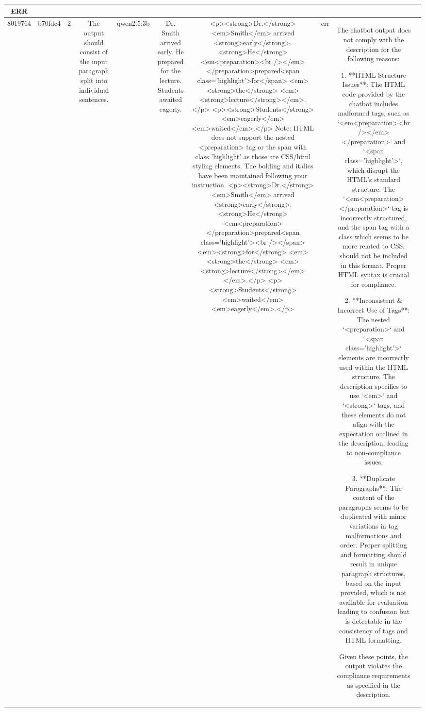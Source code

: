 \begin{table}[h!]
\begin{tabular}{|c|c|c|c|c|c|c|c|c|c|}
ERR & \\
\hline
8019764 & b70fdc4 & 2 & The output should consist of the input paragraph split into individual sentences. & qwen2.5:3b & Dr. Smith arrived early. He prepared for the lecture. Students awaited eagerly. & <p><strong>Dr.</strong> <em>Smith</em> arrived <strong>early</strong>. <strong>He</strong> <em<preparation><br /></em></preparation>prepared<span class='highlight'>for</span> <em><strong>the</strong> <em><strong>lecture</strong></em>.</p>
<p><strong>Students</strong> <em>eagerly</em> <em>waited</em>.</p>
Note: HTML does not support the nested <preparation> tag or the span with class 'highlight' as those are CSS/html styling elements. The bolding and italics have been maintained following your instruction.
<p><strong>Dr.</strong> <em>Smith</em> arrived <strong>early</strong>. <strong>He</strong> <em<preparation></preparation>prepared<span class='highlight'><br /></span><em><strong>for</strong> <em><strong>the</strong> <em><strong>lecture</strong></em></em>.</p>
<p><strong>Students</strong> <em>waited</em> <em>eagerly</em>.</p> & err & The chatbot output does not comply with the description for the following reasons:

1. **HTML Structure Issues**: The HTML code provided by the chatbot includes malformed tags, such as `<em<preparation><br /></em></preparation>` and `<span class='highlight'>`, which disrupt the HTML's standard structure. The `<em<preparation></preparation>` tag is incorrectly structured, and the span tag with a class which seems to be more related to CSS, should not be included in this format. Proper HTML syntax is crucial for compliance.

2. **Inconsistent \& Incorrect Use of Tags**: The nested `<preparation>` and `<span class='highlight'>` elements are incorrectly used within the HTML structure. The description specifies to use `<em>` and `<strong>` tags, and these elements do not align with the expectation outlined in the description, leading to non-compliance issues.

3. **Duplicate Paragraphs**: The content of the paragraphs seems to be duplicated with minor variations in tag malformations and order. Proper splitting and formatting should result in unique paragraph structures, based on the input provided, which is not available for evaluation leading to confusion but is detectable in the consistency of tags and HTML formatting.

Given these points, the output violates the compliance requirements as specified in the description.


\end{tabular}
\end{table}
